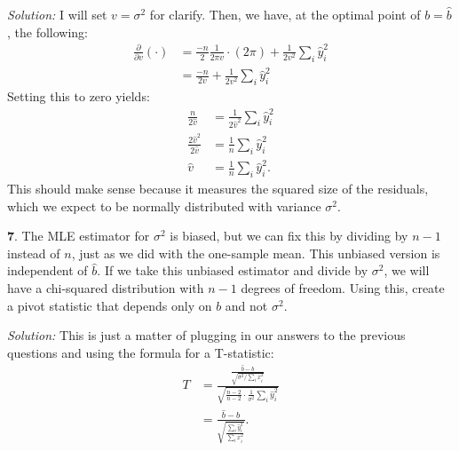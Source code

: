 \documentclass{tufte-handout}
\begin{document}
\textit{Solution:} I will set $v = \sigma^2$ for clarify. Then, we have, at the optimal point of
$b = \widehat{b}$, the following:
\begin{align*}
\frac{\partial}{\partial v} (\cdot) &= \frac{-n}{2} \frac{1}{2\pi v} \cdot (2\pi) + \frac{1}{2v^2} \sum_i \widehat{y}_i^2 \\
&= \frac{-n}{2v} + \frac{1}{2v^2} \sum_i \widehat{y}_i^2
\end{align*}
Setting this to zero yields:
\begin{align*}
\frac{n}{2\widehat{v}} &= \frac{1}{2\widehat{v}^2} \sum_i \widehat{y}_i^2 \\
\frac{2\widehat{v}^2}{2\widehat{v}} &= \frac{1}{n} \sum_i \widehat{y}_i^2 \\
\widehat{v} &= \frac{1}{n} \sum_i \widehat{y}_i^2.
\end{align*}
This should make sense because it measures the squared size of the residuals,
which we expect to be normally distributed with variance $\sigma^2$.

\textbf{7}. The MLE estimator for $\sigma^2$ is biased, but we can fix this by dividing by
$n-1$ instead of $n$, just as we did with the one-sample mean. This unbiased
version is independent of $\widehat{b}$. If we take this unbiased estimator and
divide by $\sigma^2$, we will have a chi-squared distribution with $n-1$ degrees
of freedom. Using this, create a pivot statistic that depends only on $b$ and not
$\sigma^2$.

\textit{Solution:} This is just a matter of plugging in our answers to the previous questions and
using the formula for a T-statistic:
\begin{align*}
T &= \frac{\frac{\widehat{b} - b}{\sqrt{\sigma^2 / \sum_i x_i^2}}}{
  \sqrt{ \frac{n-2}{n-2} \cdot \frac{1}{\sigma^2} \sum_i \widehat{y}_i^2 }
} \\
&=
\frac{\widehat{b} - b}{\sqrt{\frac{\sum_i \widehat{y}_i^2}{\sum_i x_i^2}}}.
\end{align*}
\end{document}
